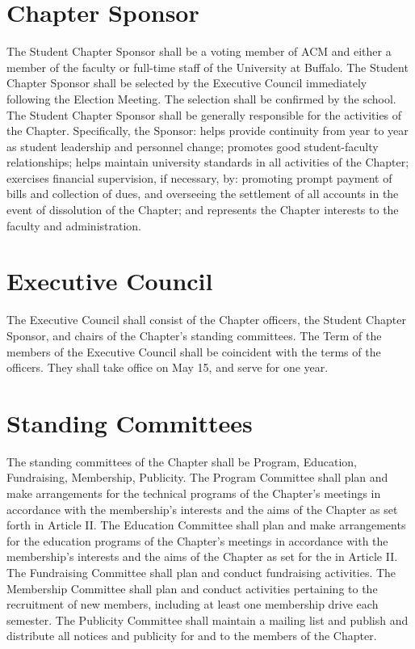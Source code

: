 \documentclass{article}
\begin{document}
\section{Chapter Sponsor}
The Student Chapter Sponsor shall be a voting member of ACM and either a member of the faculty or full-time staff of the University at Buffalo.
The Student Chapter Sponsor shall be selected by the Executive Council immediately following the Election Meeting. The selection shall be confirmed by the school.
The Student Chapter Sponsor shall be generally responsible for the activities of the Chapter. Specifically, the Sponsor:
helps provide continuity from year to year as student leadership and personnel change;
promotes good student-faculty relationships;
helps maintain university standards in all activities of the Chapter;
exercises financial supervision, if necessary, by:
promoting prompt payment of bills and collection of dues, and
overseeing the settlement of all accounts in the event of dissolution of the Chapter; and
represents the Chapter interests to the faculty and administration.

\section{Executive Council}
The Executive Council shall consist of the Chapter officers, the Student Chapter Sponsor, and chairs of the Chapter’s standing committees.
The Term of the members of the Executive Council shall be coincident with the terms of the officers. They shall take office on May 15, and serve for one year.

\section{Standing Committees}
The standing committees of the Chapter shall be Program, Education, Fundraising, Membership, Publicity.
The Program Committee shall plan and make arrangements for the technical programs of the Chapter’s meetings in accordance with the membership’s interests and the aims of the Chapter as set forth in Article II.
The Education Committee shall plan and make arrangements for the education programs of the Chapter’s meetings in accordance with the membership’s interests and the aims of the Chapter as set for the in Article II.
The Fundraising Committee shall plan and conduct fundraising activities.
The Membership Committee shall plan and conduct activities pertaining to the recruitment of new members, including at least one membership drive each semester.
The Publicity Committee shall maintain a mailing list and publish and distribute all notices and publicity for and to the members of the Chapter.
\end{document}
